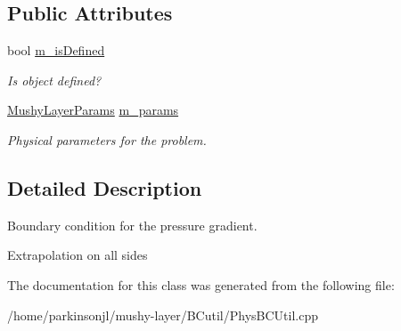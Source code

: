 \subsection*{Public Attributes}
\begin{DoxyCompactItemize}
\item 
\hypertarget{class_basic_grad_pressure_b_c_function_ab06c724ad26290b8b8fd7fb332890d0f}{bool \hyperlink{class_basic_grad_pressure_b_c_function_ab06c724ad26290b8b8fd7fb332890d0f}{m\-\_\-is\-Defined}}\label{class_basic_grad_pressure_b_c_function_ab06c724ad26290b8b8fd7fb332890d0f}

\begin{DoxyCompactList}\small\item\em Is object defined? \end{DoxyCompactList}\item 
\hypertarget{class_basic_grad_pressure_b_c_function_a803f06865c3dcb81d220f4410b569113}{\hyperlink{class_mushy_layer_params}{Mushy\-Layer\-Params} \hyperlink{class_basic_grad_pressure_b_c_function_a803f06865c3dcb81d220f4410b569113}{m\-\_\-params}}\label{class_basic_grad_pressure_b_c_function_a803f06865c3dcb81d220f4410b569113}

\begin{DoxyCompactList}\small\item\em Physical parameters for the problem. \end{DoxyCompactList}\end{DoxyCompactItemize}


\subsection{Detailed Description}
Boundary condition for the pressure gradient. 

Extrapolation on all sides 

The documentation for this class was generated from the following file\-:\begin{DoxyCompactItemize}
\item 
/home/parkinsonjl/mushy-\/layer/\-B\-Cutil/Phys\-B\-C\-Util.\-cpp\end{DoxyCompactItemize}
